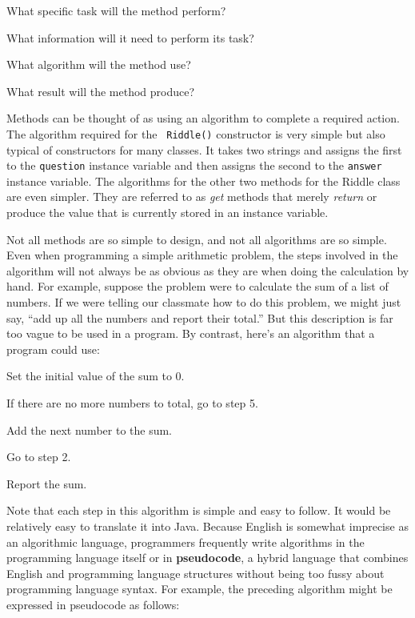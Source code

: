 \begin{BL}
\item  What specific task will the method perform?
\item  What information will it need to perform its task?
\item  What algorithm will the method use?
\item  What result will the method produce?
\end{BL}

\noindent Methods can be thought of as using an algorithm to 
complete a required action.  The algorithm required for the {\tt
Riddle()} constructor is very simple but also typical of constructors
for many classes. It takes two strings and assigns the first to the
{\tt question} instance variable and then assigns the second to the
{\tt answer} instance variable.  The algorithms for the other two
methods for the Riddle class are even simpler.  They are referred to
as {\it get} methods that merely {\it return} or produce the value
that is currently stored in an instance variable.

Not all methods are so simple to design, and not all algorithms are so
simple.  Even when programming a simple arithmetic problem, the steps
involved in the algorithm will not always be as obvious as they are
when doing the calculation by hand.  For example, suppose the problem
were to calculate the sum of a list of numbers.  If we were telling our
classmate how to do this problem, we might just say, ``add up all the
numbers and report their total.''  But this description is far too
vague to be used in a program.   By contrast, here's an algorithm that
a program could use:

\begin{NL}
\item  Set the initial value of the sum to 0.
\item  If there are no more numbers to total, go to step 5.
\item  Add the next number to the sum.
\item  Go to step 2.
\item  Report the sum.
\end{NL}

\noindent Note that each step in this algorithm is simple and easy
to follow.   It would be relatively easy to translate it into
Java.  Because English is somewhat imprecise as an algorithmic
language, programmers frequently write algorithms in the programming
language itself or in {\bf pseudocode}, a hybrid
language that combines English and programming language structures
without being too fussy about programming language syntax.  For
example, the preceding algorithm might be expressed in pseudocode as
follows:

